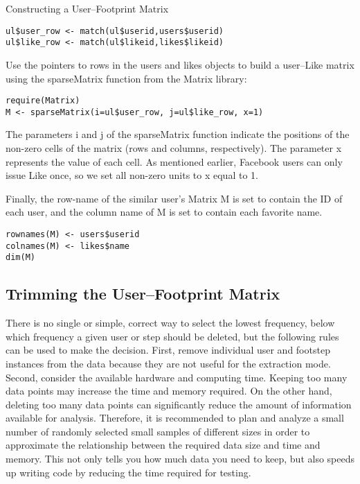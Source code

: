 Constructing a User–Footprint Matrix

\begin{verbatim}
ul$user_row <- match(ul$userid,users$userid)
ul$like_row <- match(ul$likeid,likes$likeid)
\end{verbatim}

Use the pointers to rows in the users and likes objects to build 
a user–Like matrix using the sparseMatrix function from the Matrix
 library:

\begin{verbatim}
require(Matrix)
M <- sparseMatrix(i=ul$user_row, j=ul$like_row, x=1)
\end{verbatim}

The parameters i and j of the sparseMatrix function indicate the 
positions of the non-zero cells of the matrix (rows and columns, 
respectively). The parameter x represents the value of each cell. 
As mentioned earlier, Facebook users can only issue Like once, so 
we set all non-zero units to x equal to 1.

Finally, the row-name of the similar user's Matrix M is set to 
contain the ID of each user, and the column name of M is set to 
contain each favorite name.

\begin{verbatim}
rownames(M) <- users$userid
colnames(M) <- likes$name
dim(M)
\end{verbatim}

\subsection{Trimming the User–Footprint Matrix}

There is no single or simple, correct way to select the lowest 
frequency, below which frequency a given user or step should be 
deleted, but the following rules can be used to make the decision.
 First, remove individual user and footstep instances from the 
data because they are not useful for the extraction mode. Second, 
consider the available hardware and computing time. Keeping too 
many data points may increase the time and memory required. On the
 other hand, deleting too many data points can significantly reduce
 the amount of information available for analysis. Therefore, it is
 recommended to plan and analyze a small number of randomly 
selected small samples of different sizes in order to approximate 
the relationship between the required data size and time and 
memory. This not only tells you how much data you need to keep, 
but also speeds up writing code by reducing the time required for 
testing.


